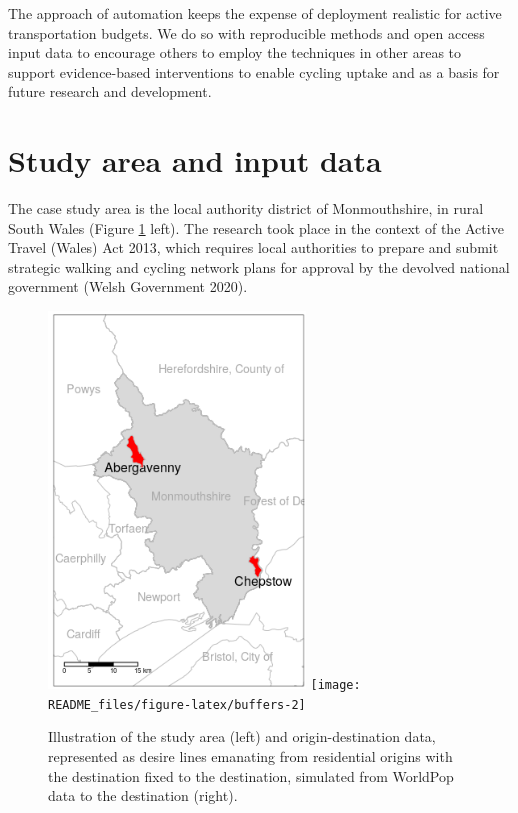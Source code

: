 \documentclass[galley]{jtlu-article-2col}
\begin{document}
The approach of automation keeps the expense of deployment realistic for active transportation budgets.
We do so with reproducible methods and open access input data to encourage others to employ the techniques in other areas to support evidence-based interventions to enable cycling uptake and as a basis for future research and development.

\hypertarget{study-area-and-input-data}{%
\section{Study area and input data}\label{study-area-and-input-data}}

The case study area is the local authority district of Monmouthshire, in rural South Wales (Figure \ref{fig:buffers} left).
The research took place in the context of the Active Travel (Wales) Act 2013, which requires local authorities to prepare and submit strategic walking and cycling network plans for approval by the devolved national government (Welsh Government 2020).

\begin{figure}

{\centering \includegraphics[width=0.4\linewidth,height=10cm]{README_files/figure-gfm/study-area-cropped} \texttt{[image: README\_files/figure-latex/buffers-2]} 

}

\caption{Illustration of the study area (left) and origin-destination data, represented as desire lines emanating from residential origins with the destination fixed to the destination, simulated from WorldPop data to the destination (right).}\label{fig:buffers}
\end{figure}
\end{document}

